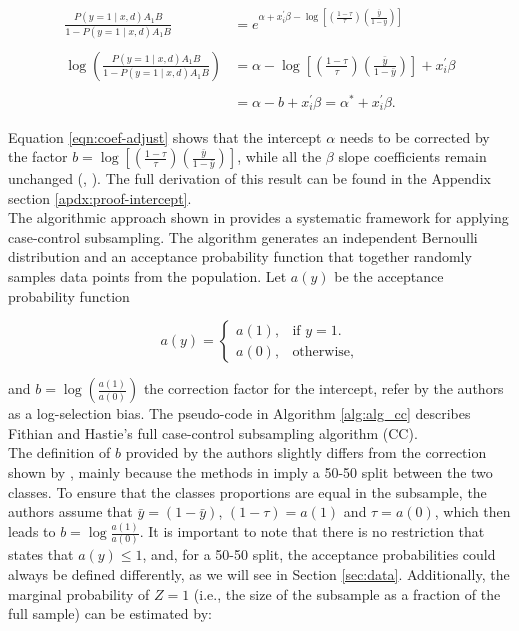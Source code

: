 \begin{align}
    \nonumber \frac{P(y=1 \mid x, d) A_1 B}{1 - P(y=1 \mid x, d) A_1 B} &= e^{\alpha + x_i^{\prime} \beta - \log \left[\left(\frac{1-\tau}{\tau}\right)\left(\frac{\bar{y}}{1-\bar{y}}\right)\right]}\\
    \nonumber \\
    \nonumber \log \left( \frac{P(y=1 \mid x, d) A_1 B}{1 - P(y=1 \mid x, d) A_1 B}\right) &= \alpha - \log \left[\left(\frac{1-\tau}{\tau}\right)\left(\frac{\bar{y}}{1-\bar{y}}\right)\right] + x_i^{\prime} \beta \\
    \nonumber \\
    &= \alpha - b + x_i^{\prime} \beta = \alpha^* + x_i^{\prime} \beta.
    \label{eqn:coef-adjust}
\end{align}
    
Equation \ref{eqn:coef-adjust} shows that the intercept $\alpha$ needs to be corrected by the factor $b= \log \left[\left(\frac{1-\tau}{\tau}\right)\left(\frac{\bar{y}}{1-\bar{y}}\right)\right]$, while all the $\beta$ slope coefficients remain unchanged (\cite{king2001logistic}, \cite{scott1986}). The full derivation of this result can be found in the Appendix section \ref{apdx:proof-intercept}.\\

The algorithmic approach shown in \textcite{hastie2014} provides a systematic framework for applying case-control subsampling. The algorithm generates an independent Bernoulli distribution and an acceptance probability function that together randomly samples data points from the population. Let $a(y)$ be the acceptance probability function

\begin{equation}
  a(y)=\begin{cases}
    a(1), & \text{if $y=1$}.\\
    a(0), & \text{otherwise},
  \end{cases}
\end{equation}

and $b=\log \left( \frac{a(1)}{a(0)} \right)$ the correction factor for the intercept, refer by the authors as a log-selection bias. The pseudo-code in Algorithm \ref{alg:alg_cc} describes Fithian and Hastie's full case-control subsampling algorithm (CC).\\

The definition of $b$ provided by the authors slightly differs from the correction shown by \textcite{king2001logistic}, mainly because the methods in \textcite{hastie2014} imply a 50-50 split between the two classes. To ensure that the classes proportions are equal in the subsample, the authors assume that $\bar{y} = (1- \bar{y})$, $(1-\tau)=a(1)$ and $\tau = a(0)$, which then leads to $b = \log\frac{a(1)}{a(0)}$. It is important to note that there is no restriction that states that $a(y)\leq 1$, and, for a 50-50 split, the acceptance probabilities could always be defined differently, as we will see in Section \ref{sec:data}. Additionally, the marginal probability of $Z=1$ (i.e., the size of the subsample as a fraction of the full sample) can be estimated by:

